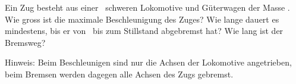 Ein Zug besteht aus einer \mLoO\ schweren Lokomotive und Güterwagen der Masse \mWaO. Wie gross ist die maximale Beschleunigung des Zuges? Wie lange dauert es mindestens, bis er von \vZuO\ bis zum Stillstand abgebremst hat? Wie lang ist der Bremsweg?

Hinweis: Beim Beschleunigen sind nur die Achsen der Lokomotive angetrieben, beim Bremsen werden dagegen alle Achsen des Zugs gebremst.
